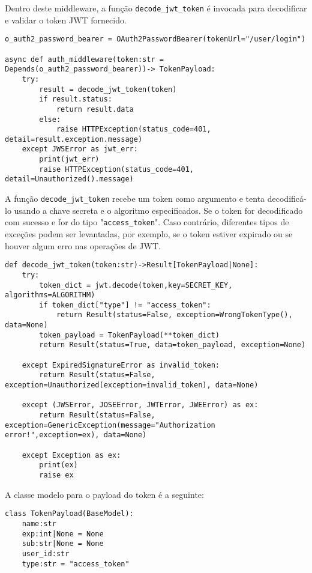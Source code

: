 Dentro deste middleware, a função \texttt{decode\_jwt\_token} é invocada para decodificar e validar o token JWT fornecido.

\begin{verbatim}
o_auth2_password_bearer = OAuth2PasswordBearer(tokenUrl="/user/login")

async def auth_middleware(token:str = Depends(o_auth2_password_bearer))-> TokenPayload:
    try:
        result = decode_jwt_token(token)
        if result.status:
            return result.data
        else:
            raise HTTPException(status_code=401, detail=result.exception.message)
    except JWSError as jwt_err:
        print(jwt_err)
        raise HTTPException(status_code=401, detail=Unauthorized().message)
\end{verbatim}

A função \texttt{decode\_jwt\_token} recebe um token como argumento e tenta decodificá-lo usando a chave secreta e o algoritmo especificados. Se o token for decodificado com sucesso e for do tipo "\texttt{access\_token}". Caso contrário, diferentes tipos de exceções podem ser levantadas, por exemplo, se o token estiver expirado ou se houver algum erro nas operações de JWT.

\begin{verbatim}
def decode_jwt_token(token:str)->Result[TokenPayload|None]:
    try:
        token_dict = jwt.decode(token,key=SECRET_KEY, algorithms=ALGORITHM)
        if token_dict["type"] != "access_token":
            return Result(status=False, exception=WrongTokenType(), data=None)
        token_payload = TokenPayload(**token_dict)
        return Result(status=True, data=token_payload, exception=None)
    
    except ExpiredSignatureError as invalid_token:
        return Result(status=False, exception=Unauthorized(exception=invalid_token), data=None)

    except (JWSError, JOSEError, JWTError, JWEError) as ex:
        return Result(status=False, exception=GenericException(message="Authorization error!",exception=ex), data=None)

    except Exception as ex:
        print(ex)
        raise ex
\end{verbatim}

A classe modelo para o payload do token é a seguinte:
\begin{verbatim}
class TokenPayload(BaseModel):
    name:str
    exp:int|None = None
    sub:str|None = None
    user_id:str
    type:str = "access_token"
\end{verbatim}

